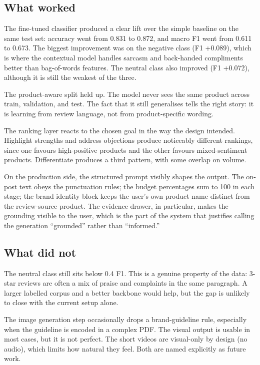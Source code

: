 \documentclass[12pt,a4paper]{report}
\begin{document}
\subsection*{What worked}

The fine-tuned classifier produced a clear lift over the simple baseline on the same test set: accuracy went from 0.831 to 0.872, and macro F1 went from 0.611 to 0.673. The biggest improvement was on the negative class (F1 +0.089), which is where the contextual model handles sarcasm and back-handed compliments better than bag-of-words features. The neutral class also improved (F1 +0.072), although it is still the weakest of the three.

The product-aware split held up. The model never sees the same product across train, validation, and test. The fact that it still generalises tells the right story: it is learning from review language, not from product-specific wording.

The ranking layer reacts to the chosen goal in the way the design intended. Highlight strengths and address objections produce noticeably different rankings, since one favours high-positive products and the other favours mixed-sentiment products. Differentiate produces a third pattern, with some overlap on volume.

On the production side, the structured prompt visibly shapes the output. The on-post text obeys the punctuation rules; the budget percentages sum to 100 in each stage; the brand identity block keeps the user's own product name distinct from the review-source product. The evidence drawer, in particular, makes the grounding visible to the user, which is the part of the system that justifies calling the generation ``grounded'' rather than ``informed.''

\subsection*{What did not}

The neutral class still sits below 0.4 F1. This is a genuine property of the data: 3-star reviews are often a mix of praise and complaints in the same paragraph. A larger labelled corpus and a better backbone would help, but the gap is unlikely to close with the current setup alone.

The image generation step occasionally drops a brand-guideline rule, especially when the guideline is encoded in a complex PDF. The visual output is usable in most cases, but it is not perfect. The short videos are visual-only by design (no audio), which limits how natural they feel. Both are named explicitly as future work.
\end{document}
